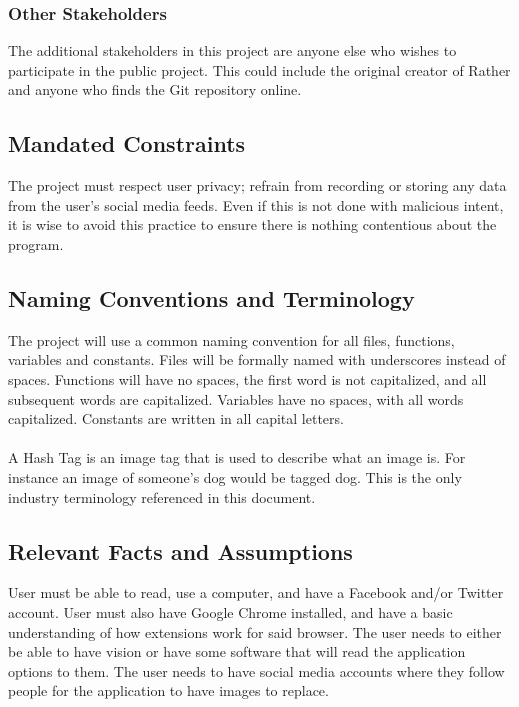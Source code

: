 \documentclass[12pt, titlepage]{article}
\begin{document}
\subsubsection{Other Stakeholders}
The additional stakeholders in this project are anyone else who wishes to participate in the public project. This could include the original creator of Rather and anyone who finds the Git repository online. 

\subsection{Mandated Constraints}
The project must respect user privacy; refrain from recording or storing any data from the user's social media feeds. Even if this is not done with malicious intent, it is wise to avoid this practice to ensure there is nothing contentious about the program.

\subsection{Naming Conventions and Terminology}
The project will use a common naming convention for all files, functions, variables and constants. Files will be formally named with underscores instead of spaces. Functions will have no spaces, the first word is not capitalized, and all subsequent words are capitalized. Variables have no spaces, with all words capitalized. Constants are written in all capital letters.\\
\\
 A Hash Tag is an image tag that is used to describe what an image is. For instance an image of someone's dog would be tagged dog. This is the only industry terminology referenced in this document.  

\subsection{Relevant Facts and Assumptions}
User must be able to read, use a computer, and have a Facebook and/or Twitter account. User must also have Google Chrome installed, and have a basic understanding of how extensions work for said browser. The user needs to either be able to have vision or have some software that will read the application options to them. The user needs to have social media accounts where they follow people for the application to have images to replace.%
\end{document}
